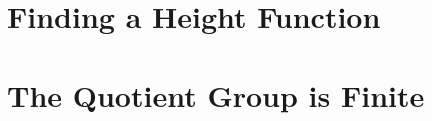 \documentclass[11pt, oneside,a4paper]{article}
\theoremstyle{definition}
\theoremstyle{remark}
\begin{document}
\clearpage
\section{Finding a Height Function}%
\label{sec:finding_a_height_function}


\clearpage
\section{The Quotient Group is Finite}%
\label{sec:the_quotient_group_is_finite}




\clearpage
\nocite{*}

\end{document}
